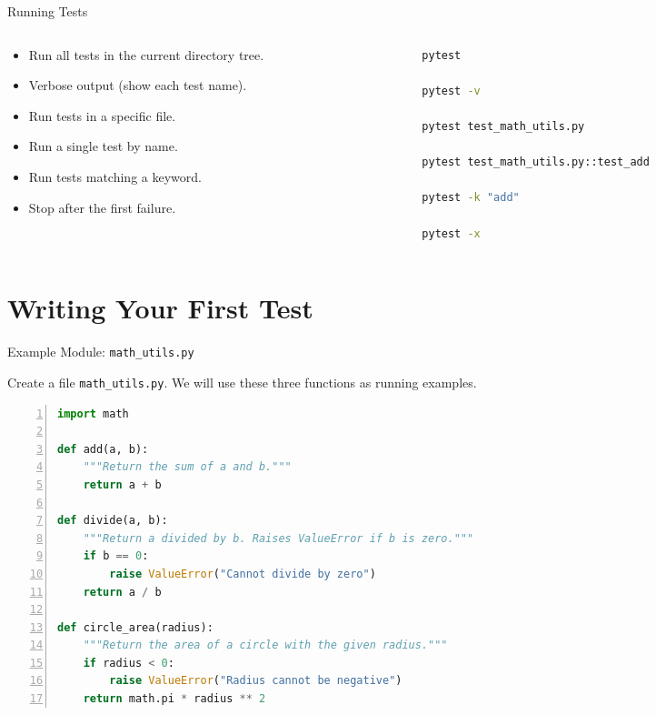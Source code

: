 \begin{frame}{Running Tests}
\setlength{\leftmargini}{0.5cm}
\begin{columns}[c,t,totalwidth=1.0\textwidth]
\begin{column}[c]{0.49\linewidth}
\begin{block}{}
\begin{itemize}
\item Run all tests in the current directory tree.
\item Verbose output (show each test name).
\item Run tests in a specific file.
\item Run a single test by name.
\item Run tests matching a keyword.
\item Stop after the first failure.
\end{itemize}
\end{block}
\end{column}
\begin{column}[c]{0.49\linewidth}
\begin{lstlisting}[style=fullwidth,language=bash,numbers=none]
pytest

pytest -v

pytest test_math_utils.py

pytest test_math_utils.py::test_add

pytest -k "add"

pytest -x
\end{lstlisting}
\end{column}
\end{columns}
\end{frame}

\section{Writing Your First Test}

\begin{frame}{Example Module: \texttt{math\_utils.py}}
\begin{block}{}
Create a file \texttt{math\_utils.py}. We will use these three functions as running examples.
\end{block}
\begin{lstlisting}[language=python,numbers=left,xleftmargin=0.05\textwidth,xrightmargin=0.05\textwidth]
import math

def add(a, b):
    """Return the sum of a and b."""
    return a + b

def divide(a, b):
    """Return a divided by b. Raises ValueError if b is zero."""
    if b == 0:
        raise ValueError("Cannot divide by zero")
    return a / b

def circle_area(radius):
    """Return the area of a circle with the given radius."""
    if radius < 0:
        raise ValueError("Radius cannot be negative")
    return math.pi * radius ** 2
\end{lstlisting}
\end{frame}

